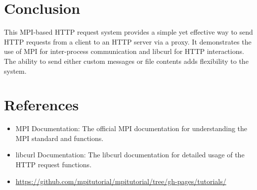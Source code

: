 \documentclass[a4paper,12pt]{article}
\begin{document}
\section{Conclusion}
This MPI-based HTTP request system provides a simple yet effective way to send HTTP requests from a client to an HTTP server via a proxy. It demonstrates the use of MPI for inter-process communication and libcurl for HTTP interactions. The ability to send either custom messages or file contents adds flexibility to the system.

\section{References}
\begin{itemize}
    \item MPI Documentation: The official MPI documentation for understanding the MPI standard and functions.
    \item libcurl Documentation: The libcurl documentation for detailed usage of the HTTP request functions.
    \item \href{https://github.com/mpitutorial/mpitutorial/tree/gh-pages/tutorials/}{https://github.com/mpitutorial/mpitutorial/tree/gh-pages/tutorials/}
\end{itemize}
\end{document}
